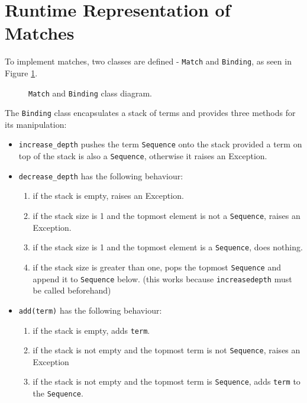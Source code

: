 \section{Runtime Representation of Matches}
\label{section:Match}

To implement matches, two classes are defined - \texttt{Match} and \texttt{Binding}, as seen in Figure \ref{class-diagram-match-binding}.

\begin{figure}[H]
	\centering
	\caption{\texttt{Match} and \texttt{Binding} class diagram.}
\label{class-diagram-match-binding}
\end{figure}

The \texttt{Binding} class encapsulates a stack of terms and provides three methods for its manipulation:

\begin{itemize}
\item 
\texttt{increase\_depth} pushes the term \texttt{Sequence} onto the stack provided a term on top of the stack is also a \texttt{Sequence}, otherwise it raises an Exception.

\item
\texttt{decrease\_depth} has the following behaviour:
	\begin{enumerate}
		\item
        if the stack is empty, raises an Exception.
		\item
		if the stack size is 1 and the topmost element is not a \texttt{Sequence}, raises an Exception.
		\item
		if the stack size is 1 and the topmost element is a \texttt{Sequence}, does nothing.
		\item
        if the stack size is greater than one, pops the topmost \texttt{Sequence} and append it to \texttt{Sequence} below. (this works because \texttt{increasedepth} must be called beforehand)
	\end{enumerate}

\item
\texttt{add(term)} has the following behaviour:
	\begin{enumerate}
		\item
         if the stack is empty, adds \texttt{term}. 
		\item
         if the stack is not empty and the topmost term is not \texttt{Sequence}, raises an Exception
		\item
        if the stack is not empty and the topmost term is \texttt{Sequence}, adds \texttt{term} to the \texttt{Sequence}.
	\end{enumerate}
\end{itemize}


